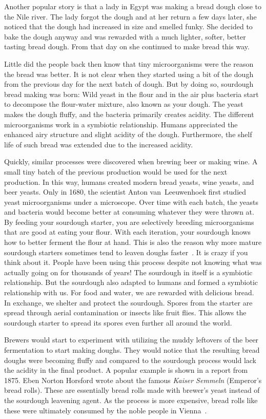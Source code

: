Another popular story is that a lady in Egypt was making
a bread dough close to the Nile river. The lady forgot the
dough and at her return a few days later, she noticed that the dough had
increased in size and smelled funky. She decided to bake
the dough anyway and was rewarded with a much
lighter, softer, better tasting bread dough. From that day
on she continued to make bread this way.~\cite{egyptian+bread}

Little did the people back then know that tiny microorganisms
were the reason the bread was better. It is not clear when
they started using a bit of the dough from the previous
day for the next batch of dough. But by doing so, sourdough
bread making was born: Wild yeast in the flour and in the air
plus bacteria start to decompose the flour-water mixture, also
known as your dough. The yeast makes the dough fluffy, and
the bacteria primarily creates acidity. The different
microorganisms work in a symbiotic relationship. Humans
appreciated the enhanced airy structure and slight acidity
of the dough. Furthermore, the shelf life of such bread
was extended due to the increased acidity.

Quickly, similar processes were discovered when brewing beer
or making wine. A small tiny batch of the previous production
would be used for the next production. In this way, humans created
modern bread yeasts, wine yeasts, and beer yeasts. Only in 1680,
the scientist Anton van~Leeuwenhoek first studied yeast microorganisms
under a microscope. Over time with each batch, the yeasts and bacteria
would become better at consuming whatever they were thrown at.
By feeding your sourdough starter, you are selectively breeding
microorganisms that are good at eating your flour. With
each iteration, your sourdough knows how to better ferment the flour
at hand. This is also the reason why more mature sourdough starters sometimes
tend to leaven doughs faster~\cite{review+of+sourdough+starters}. It is crazy if you
think about it. People have been using this process despite not
knowing what was actually going on for thousands of years! The
sourdough in itself is a symbiotic relationship. But the sourdough
also adapted to humans and formed a symbiotic relationship with us.
For food and water, we are rewarded with delicious bread. In exchange,
we shelter and protect the sourdough. Spores from the starter
are spread through aerial contamination or insects like fruit flies.
This allows the sourdough starter to spread its spores even
further all around the world.

Brewers would start to experiment with utilizing the muddy leftovers
of the beer fermentation to start making doughs. They would notice
that the resulting bread doughs were becoming fluffy and compared
to the sourdough process would lack the acidity in the final product.
A popular example is shown in a report from 1875. Eben Norton Horsford
wrote about the famous \emph{Kaiser Semmeln} (Emperor's bread rolls).
These are essentially bread rolls made with brewer's yeast instead
of the sourdough leavening agent. As the process is more expensive,
bread rolls like these were ultimately consumed by the noble people
in Vienna~\cite{vienna+breadrolls}.


